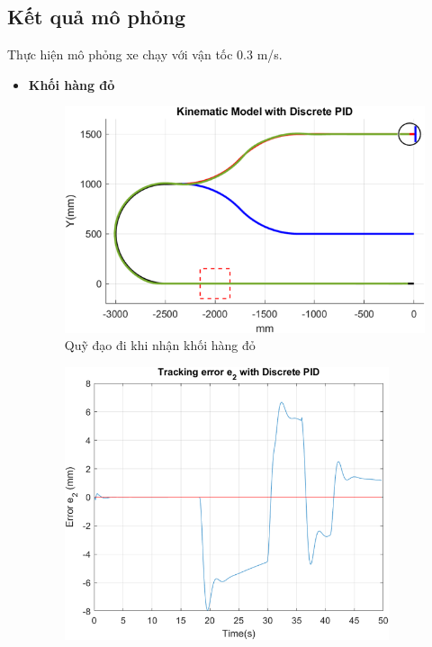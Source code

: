           \subsection{Kết quả mô phỏng}
          Thực hiện mô phỏng xe chạy với vận tốc 0.3 m/s.
          \begin{itemize}
               \item \textbf{Khối hàng đỏ}
                    \begin{figure}[H]
                         \centering
                         \includegraphics[width=1\textwidth]{pictures/chapter8/trajec_red.png}
                         \caption{Quỹ đạo đi khi nhận khối hàng đỏ}
                         \label{tra_red}
                    \end{figure}
                    \begin{figure}[H]
                         \centering
                         \includegraphics[width=0.9\textwidth]{pictures/chapter8/err_red.png}

\end{figure}
\end{itemize}

